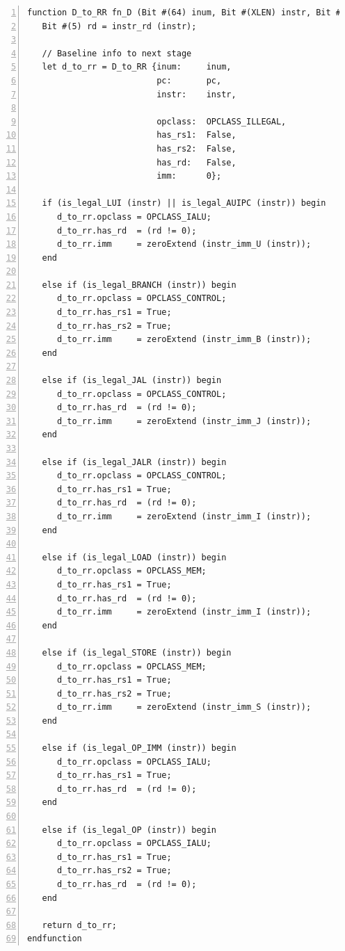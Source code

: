 \begin{Verbatim}[frame=single, numbers=left]
function D_to_RR fn_D (Bit #(64) inum, Bit #(XLEN) instr, Bit #(32) instr);
   Bit #(5) rd = instr_rd (instr);

   // Baseline info to next stage
   let d_to_rr = D_to_RR {inum:     inum,
                          pc:       pc,
                          instr:    instr,

                          opclass:  OPCLASS_ILLEGAL,
                          has_rs1:  False,
                          has_rs2:  False,
                          has_rd:   False,
                          imm:      0};

   if (is_legal_LUI (instr) || is_legal_AUIPC (instr)) begin
      d_to_rr.opclass = OPCLASS_IALU;
      d_to_rr.has_rd  = (rd != 0);
      d_to_rr.imm     = zeroExtend (instr_imm_U (instr));
   end

   else if (is_legal_BRANCH (instr)) begin
      d_to_rr.opclass = OPCLASS_CONTROL;
      d_to_rr.has_rs1 = True;
      d_to_rr.has_rs2 = True;
      d_to_rr.imm     = zeroExtend (instr_imm_B (instr));
   end

   else if (is_legal_JAL (instr)) begin
      d_to_rr.opclass = OPCLASS_CONTROL;
      d_to_rr.has_rd  = (rd != 0);
      d_to_rr.imm     = zeroExtend (instr_imm_J (instr));
   end

   else if (is_legal_JALR (instr)) begin
      d_to_rr.opclass = OPCLASS_CONTROL;
      d_to_rr.has_rs1 = True;
      d_to_rr.has_rd  = (rd != 0);
      d_to_rr.imm     = zeroExtend (instr_imm_I (instr));
   end

   else if (is_legal_LOAD (instr)) begin
      d_to_rr.opclass = OPCLASS_MEM;
      d_to_rr.has_rs1 = True;
      d_to_rr.has_rd  = (rd != 0);
      d_to_rr.imm     = zeroExtend (instr_imm_I (instr));
   end

   else if (is_legal_STORE (instr)) begin
      d_to_rr.opclass = OPCLASS_MEM;
      d_to_rr.has_rs1 = True;
      d_to_rr.has_rs2 = True;
      d_to_rr.imm     = zeroExtend (instr_imm_S (instr));
   end

   else if (is_legal_OP_IMM (instr)) begin
      d_to_rr.opclass = OPCLASS_IALU;
      d_to_rr.has_rs1 = True;
      d_to_rr.has_rd  = (rd != 0);
   end

   else if (is_legal_OP (instr)) begin
      d_to_rr.opclass = OPCLASS_IALU;
      d_to_rr.has_rs1 = True;
      d_to_rr.has_rs2 = True;
      d_to_rr.has_rd  = (rd != 0);
   end

   return d_to_rr;
endfunction
\end{Verbatim}

